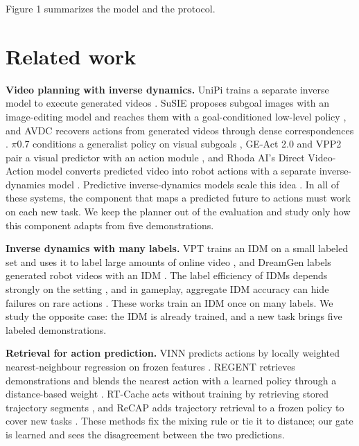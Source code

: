 \documentclass[10pt,twocolumn,letterpaper]{article}
\begin{document}
Figure 1 summarizes the model and the protocol.



\section{Related work}

\textbf{Video planning with inverse dynamics.} UniPi trains a separate inverse model to execute generated videos \cite{ref1}. SuSIE proposes subgoal images with an image-editing model and reaches them with a goal-conditioned low-level policy \cite{ref13}, and AVDC recovers actions from generated videos through dense correspondences \cite{ref14}. \ensuremath{\pi}0.7 conditions a generalist policy on visual subgoals \cite{ref2}, GE-Act 2.0 and VPP2 pair a visual predictor with an action module \cite{ref3,ref4}, and Rhoda AI's Direct Video-Action model converts predicted video into robot actions with a separate inverse-dynamics model \cite{ref5}. Predictive inverse-dynamics models scale this idea \cite{ref15}. In all of these systems, the component that maps a predicted future to actions must work on each new task. We keep the planner out of the evaluation and study only how this component adapts from five demonstrations.

\textbf{Inverse dynamics with many labels.} VPT trains an IDM on a small labeled set and uses it to label large amounts of online video \cite{ref16}, and DreamGen labels generated robot videos with an IDM \cite{ref17}. The label efficiency of IDMs depends strongly on the setting \cite{ref18}, and in gameplay, aggregate IDM accuracy can hide failures on rare actions \cite{ref19}. These works train an IDM once on many labels. We study the opposite case: the IDM is already trained, and a new task brings five labeled demonstrations.

\textbf{Retrieval for action prediction.} VINN predicts actions by locally weighted nearest-neighbour regression on frozen features \cite{ref6}. REGENT retrieves demonstrations and blends the nearest action with a learned policy through a distance-based weight \cite{ref7}. RT-Cache acts without training by retrieving stored trajectory segments \cite{ref20}, and ReCAP adds trajectory retrieval to a frozen policy to cover new tasks \cite{ref21}. These methods fix the mixing rule or tie it to distance; our gate is learned and sees the disagreement between the two predictions.
\end{document}
